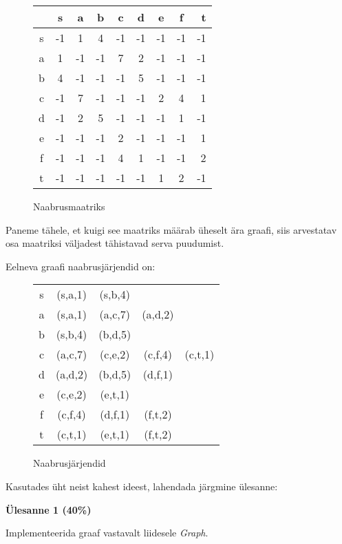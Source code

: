 \documentclass[a4paper]{article}
\begin{document}
\begin{figure}[H]
\centering
\begin{tabular}{c | c c c c c c c r}
& s & a & b & c & d & e & f & t \\
\hline
s & -1 & 1 & 4 & -1 & -1 & -1  & -1 & -1 \\
a & 1 & -1 & -1 & 7 & 2 & -1  & -1 & -1 \\
b & 4 & -1 & -1 & -1 & 5 & -1  & -1 & -1 \\
c & -1 & 7 & -1 & -1 & -1 & 2  & 4 & 1 \\
d & -1 & 2 & 5 & -1 & -1 & -1  & 1 & -1 \\
e & -1 & -1 & -1 & 2 & -1 & -1  & -1 & 1 \\
f & -1 & -1 & -1 & 4 & 1 & -1  & -1 & 2 \\
t & -1 & -1 & -1 & -1 & -1 & 1  & 2 & -1 \\
\end{tabular}
\caption{Naabrusmaatriks}
\end{figure}

Paneme tähele, et kuigi see maatriks määrab üheselt ära graafi, siis arvestatav osa maatriksi väljadest tähistavad serva puudumist.

Eelneva graafi naabrusjärjendid on:

\begin{figure}[H]
\centering
\begin{tabular}{c | c c c c}
\hline
s & (s,a,1) & (s,b,4) & & \\
a & (s,a,1) & (a,c,7) & (a,d,2)  &  \\
b & (s,b,4) & (b,d,5) &  &  \\
c & (a,c,7) & (c,e,2) & (c,f,4) & (c,t,1) \\
d & (a,d,2) & (b,d,5) & (d,f,1) &   \\
e & (c,e,2) & (e,t,1) & &\\
f & (c,f,4) & (d,f,1) & (f,t,2) & \\
t & (c,t,1) & (e,t,1) & (f,t,2) &  \\
\end{tabular}
\caption{Naabrusjärjendid}
\end{figure}

Kasutades üht neist kahest ideest, lahendada järgmine ülesanne:

\begin{problem}
\textbf{Ülesanne 1 (40\%)}

Implementeerida graaf vastavalt liidesele \textit{Graph}.
\end{problem}
\end{document}
